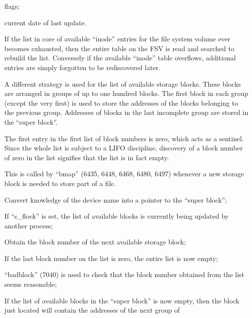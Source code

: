 \item flags;

\item current date of last update.
\ei


If the list in core of available
``inode'' entries for the file system
volume ever becomes exhausted, then the
entire table on the FSV is read and
searched to rebuild the list. Conversely if the available ``inode'' table
overflows, additional entries are simply forgotten to be rediscovered later.


A different strategy is used for the
list of available storage blocks.
These blocks are arranged in groups of
up to one hundred blocks. The first
block in each group (except the very
first) is used to store the addresses
of the blocks belonging to the previous
group. Addresses of blocks in the last
incomplete group are stored in the
``super block''.

The first entry in the first list of
block numbers is zero, which acts as a
sentinel. Since the whole list is subject to a LIFO discipline, discovery of
a block number of zero in the list signifies that the list is in fact empty.



This is called by ``bmap'' (6435, 6448,
6468, 6480, 6497) whenever a new
storage block is needed to store part
of a file.

\bd
\item[6961:] Convert knowledge of the device
      name into a pointer to the ``super
      block'';

\item[6962:] If ``s\_flock'' is set, the list of
      available blocks is currently
      being updated by another process;

\item[6967:] Obtain the block  number  of  the
      next available storage block;

\item[6968:] If the last block number  on  the
      list  is zero, the entire list is
      now empty;

\item[6970:] ``badblock''  (7040)  is  used   to
      check   that   the  block  number
      obtained from the list seems reasonable;

\item[6971:] If the list of  available  blocks
      in   the  ``super  block''  is  now
      empty,  then   the   block   just
      located    will    contain    the
      addresses of the  next  group  of

